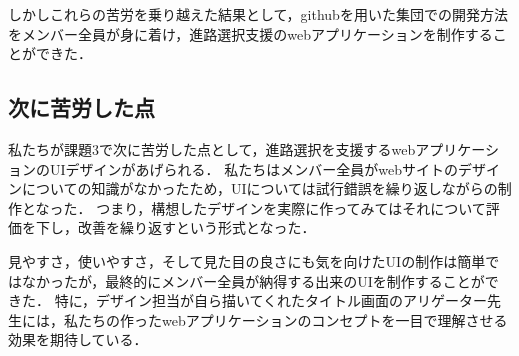 \documentclass[a4j, titlepage]{jarticle}
\begin{document}
\begin{itemize}
しかしこれらの苦労を乗り越えた結果として，githubを用いた集団での開発方法をメンバー全員が身に着け，進路選択支援のwebアプリケーションを制作することができた．
\subsection{次に苦労した点}
私たちが課題3で次に苦労した点として，進路選択を支援するwebアプリケーションのUIデザインがあげられる．
私たちはメンバー全員がwebサイトのデザインについての知識がなかったため，UIについては試行錯誤を繰り返しながらの制作となった．
つまり，構想したデザインを実際に作ってみてはそれについて評価を下し，改善を繰り返すという形式となった．

見やすさ，使いやすさ，そして見た目の良さにも気を向けたUIの制作は簡単ではなかったが，最終的にメンバー全員が納得する出来のUIを制作することができた．
特に，デザイン担当が自ら描いてくれたタイトル画面のアリゲーター先生には，私たちの作ったwebアプリケーションのコンセプトを一目で理解させる効果を期待している．\\



\end{itemize}
\end{document}
